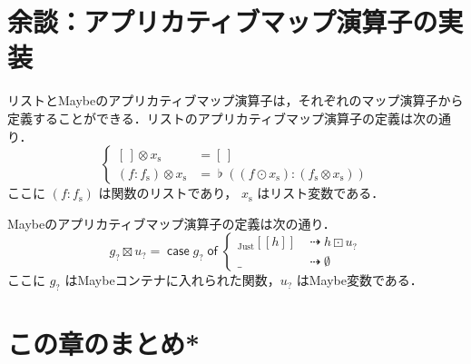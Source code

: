 \documentclass[a5paper,twoside,fleqn,draft]{jsbook}
\def\[{[\![}
\def\]{]\!]}
\newcommand{\mKeyword}[1]{\mathsf{#1}}
\newcommand{\mIfKeyword}{\mKeyword{if}}
\newcommand{\mCaseKeyword}{\mKeyword{case}}
\newcommand{\mOfKeyword}{\mKeyword{of}}
\newcommand{\mOtherwiseKeyword}{\mKeyword{otherwise}}
\DeclareMathOperator{\mCaseKW}{\mCaseKeyword}
\DeclareMathOperator{\mIf}{\mIfKeyword}
\DeclareMathOperator{\mOfKW}{\mOfKeyword}
\DeclareMathOperator{\mOtherwise}{\mOtherwiseKeyword}
\newcommand{\mEmptyList}{{[\,]}}
\newcommand{\mNothing}{\emptyset}
\DeclareMathOperator{\mAppMapList}{\otimes}
\DeclareMathOperator{\mAppMapMaybe}{\boxtimes}
\DeclareMathOperator{\mIfSo}{\dashrightarrow}
\DeclareMathOperator{\mJoinList}{\flat} %
\DeclareMathOperator{\mLogicalAnd}{\wedge}
\DeclareMathOperator{\mMapList}{\odot}
\DeclareMathOperator{\mMapMaybe}{\boxdot}
\newcommand{\mValueConstructor}[1]{\mathrm{#1}}
\newcommand{\mValueWith}[2]{{}_\mValueConstructor{#1}\[#2\]}
\newcommand{\mJustWith}[1]{\mValueWith{Just}{#1}}
\newcommand{\mList}[1]{{#1}_\mathrm{s}}
\newcommand{\mMaybe}[1]{{#1}_?}
\newcommand{\mCaseOf}[1]{\mCaseKW#1\mOfKW}
\begin{document}
\section{余談：アプリカティブマップ演算子の実装}

リストとMaybeのアプリカティブマップ演算子は，それぞれのマップ演算子から定義することができる．リストのアプリカティブマップ演算子の定義は次の通り．
\begin{equation}
  \left\{
  \begin{aligned}
    \mEmptyList\mAppMapList\mList{x}
    &=\mEmptyList\\
    (f:\mList{f})\mAppMapList\mList{x}
    &=\mJoinList{}((f\mMapList\mList{x}):(\mList{f}\mAppMapList\mList{x}))
  \end{aligned}
  \right.
\end{equation}
ここに $(f:\mList{f})$ は関数のリストであり， $\mList{x}$ はリスト変数である．

Maybeのアプリカティブマップ演算子の定義は次の通り．
\begin{equation}
\label{eq:maybe-applicative-map-by-maybe-map}
\mMaybe{g}\mAppMapMaybe\mMaybe{u}
=\mCaseOf{\mMaybe{g}}
\begin{cases}
\mJustWith{h}&\mIfSo h\mMapMaybe\mMaybe{u}\\
\_&\mIfSo\mNothing
\end{cases}
\end{equation}
ここに $\mMaybe{g}$ はMaybeコンテナに入れられた関数，$\mMaybe{u}$ はMaybe変数である．

\section{この章のまとめ*}
\end{document}
